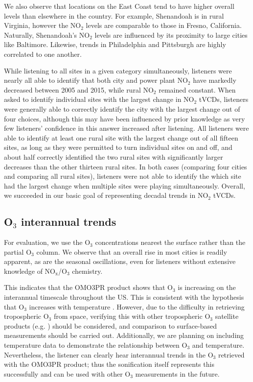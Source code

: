 \documentclass[a4paper,10pt,oneside]{article}
\newcommand{\ce}[1]{$\mathrm{#1}$}
\begin{document}
\begin{sloppy}
We also observe that locations on the East Coast tend to have higher overall levels than elsewhere in the country.  For example, Shenandoah is in rural Virginia, however the \ce{NO_2} levels are comparable to those in Fresno, California.  Naturally, Shenandoah's  \ce{NO_2} levels are influenced by its proximity to large cities like Baltimore. Likewise, trends in Philadelphia and Pittsburgh are highly correlated to one another.

While listening to all sites in a given category simultaneously, listeners were nearly all able to identify that both city and power plant \ce{NO_2} have markedly decreased between 2005 and 2015, while rural \ce{NO_2} remained constant. When asked to identify individual sites with the largest change in \ce{NO_2} tVCDs, listeners were generally able to correctly identify the city with the largest change out of four choices, although this may have been influenced by prior knowledge as very few listeners' confidence in this answer increased after listening. All listeners were able to identify at least one rural site with the largest change out of all fifteen sites, as long as they were permitted to turn individual sites on and off, and about half correctly identified the two rural sites with significantly larger decreases than the other thirteen rural sites. In both cases (comparing four cities and comparing all rural sites), listeners were not able to identify the which site had the largest change when multiple sites were playing simultaneously.  Overall, we succeeded in our basic goal of representing decadal trends in \ce{NO_2} tVCDs.

\subsection{O$_3$ interannual trends}
For evaluation, we use the \ce{O_3} concentrations nearest the surface rather than the partial \ce{O_3} column.  We observe that an overall rise in most cities is readily apparent, as are the seasonal oscillations, even for listeners without extensive knowledge of \ce{NO_x}/\ce{O_3} chemistry.

This indicates that the OMO3PR product shows that \ce{O_3} is increasing on the interannual timescale throughout the US. This is consistent with the hypothesis that \ce{O_3} increases with temperature \cite{lin17}. However, due to the difficulty in retrieving tropospheric \ce{O_3} from space, verifying this with other tropospheric \ce{O_3} satellite products (e.g. \cite{choi08}) should be considered, and comparison to surface-based measurements should be carried out. Additionally, we are planning on including temperature data to demonstrate the relationship between \ce{O_3} and temperature.  Nevertheless, the listener can clearly hear interannual trends in the \ce{O_3} retrieved with the OMO3PR product; thus the sonification itself represents this successfully and can be used with other \ce{O_3} measurements in the future.


\end{sloppy}
\end{document}
